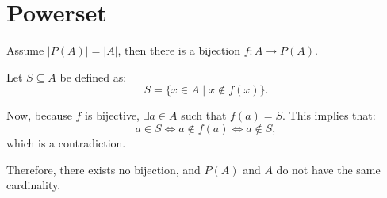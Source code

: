 


\setcounter{section}{2}

\section{Powerset}

Assume $|P(A)| = |A|$, then there is a bijection $f: A \to P(A)$.

Let $S \subseteq A$ be defined as:
\[
S = \{x \in A \mid x \notin f(x)\}.
\]

Now, because $f$ is bijective, $\exists a \in A$ such that $f(a) = S$. This implies that:
\[
a \in S \iff a \notin f(a) \iff a \notin S,
\]
which is a contradiction. 

Therefore, there exists no bijection, and $P(A)$ and $A$ do not have the same cardinality.

